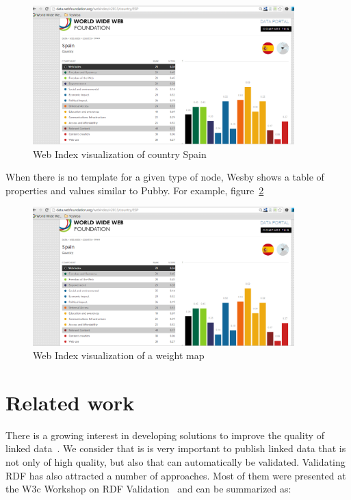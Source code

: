 \documentclass{acm_proc_article-sp}
\begin{document}
\begin{figure}[h]
\begin{center}
  \includegraphics[width=0.9\textwidth]{WebIndexSpain}
\end{center}
\caption{Web Index visualization of country Spain}
\label{Fig:WebIndexSpain}
\end{figure}

When there is no template for a given type of node, Wesby shows a table of properties and values similar to Pubby. For example, figure~\ref{Fig:WebIndexWeightMap}

\begin{figure}[h]
\begin{center}
  \includegraphics[width=0.9\textwidth]{WebIndexSpain}
\end{center}
\caption{Web Index visualization of a weight map}
\label{Fig:WebIndexWeightMap}
\end{figure}
  
\section{Related work}

There is a growing interest in developing solutions to improve the quality of linked data~\cite{hogan10,Mendes12,kontokostasDatabugger}. 
We consider that is is very important to publish linked data that is not only of high
 quality, but also that can automatically be validated. 
 Validating RDF has also attracted a number of approaches. 
 Most of them were presented at the W3c Workshop on RDF Validation~\cite{RDFValidation} and can
be summarized as: 
\end{document}
